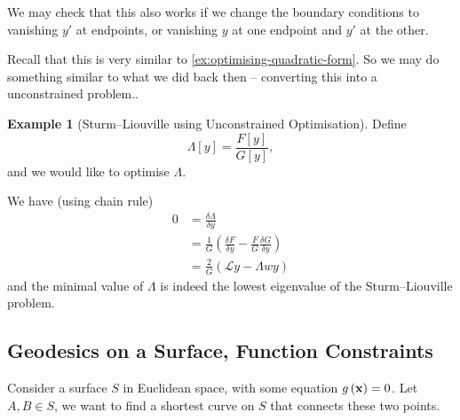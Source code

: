 \documentclass[11pt]{article}
\numberwithin{equation}{section}
\theoremstyle{definition}
\newtheorem{example}[theorem]{Example}
\theoremstyle{remark}
\newcommand{\pqty}[1]{\left(#1\right)}
\newcommand{\bqty}[1]{\left[#1\right]}
\newcommand{\fdv}[2]{\frac{\delta #1}{\delta #2}}
\begin{document}
We may check that this also works if we change the boundary conditions to vanishing \(y'\) at endpoints, or vanishing \(y\) at one endpoint and \(y'\) at the other.

Recall that this is very similar to \autoref{ex:optimising-quadratic-form}. So we may do something similar to what we did back then -- converting this into a unconstrained problem..

\begin{example}[Sturm--Liouville using Unconstrained Optimisation]\label{variation-unit-0054}
    Define
    \[
        \Lambda \bqty{y} = \frac{F\bqty{y}}{G\bqty{y}},
    \]
    and we would like to optimise \(\Lambda\).

    We have (using chain rule)
    \begin{align*}
        0 &= \fdv{\Lambda}{y} \\
        &= \frac{1}{G} \pqty{\fdv{F}{y} - \frac{F}{G} \fdv{G}{y}} \\
        &= \frac{2}{G} \pqty{\mathcal{L} y - \Lambda w y}
    \end{align*}
    and the minimal value of \(\Lambda\) is indeed the lowest eigenvalue of the Sturm--Liouville problem.
\end{example}

\subsection{Geodesics on a Surface, Function Constraints}

Consider a surface \(S\) in Euclidean space, with some equation \(g\pqty{\vb{x}} = 0\). Let \(A, B \in S\), we want to find a shortest curve on \(S\) that connects these two points.
\end{document}
